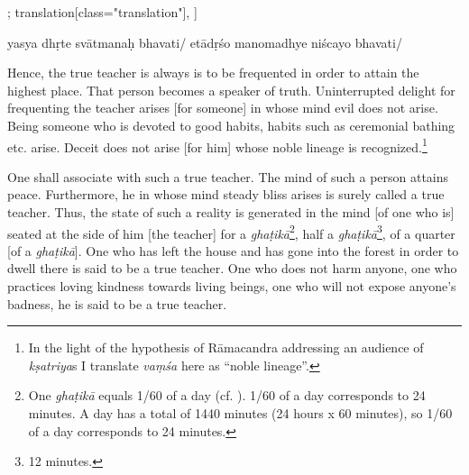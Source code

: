 \begin{alignment}[
  texts=edition[class="edition"];
  translation[class="translation"],
  ]
\begin{edition}
\begin{prose}[p57_03]
yasya
dhṛte
svātmanaḥ
bhavati/ 
etādṛśo manomadhye niścayo bhavati/
\end{prose}
  \end{edition}
  \begin{translation}
    \begin{tlate}[p57_02]
      \noindent
Hence, the true teacher is always is to be frequented in order to attain the highest place. That person becomes a speaker of truth. Uninterrupted delight for frequenting the teacher arises [for someone] in whose mind evil does not arise. Being someone who is devoted to good habits, habits such as ceremonial bathing etc. arise. Deceit does not arise [for him] whose noble lineage is recognized.\footnote{In the light of the hypothesis of Rāmacandra addressing an audience of \textit{kṣatriya}s I translate \textit{vaṃśa} here as ``noble lineage''.}

One shall associate with such a true teacher. The mind of such a person attains peace. Furthermore, he in whose mind steady bliss arises is surely called a true teacher. Thus, the state of such a reality is generated in the mind [of one who is] seated at the side of him [the teacher] for a \textit{ghaṭikā}\footnote{One \textit{ghaṭikā} equals 1/60 of a day (cf. \citeauthor[1966: 114]{sircar1966}). 1/60 of a day corresponds to 24 minutes. A day has a total of 1440 minutes (24 hours x 60 minutes), so 1/60 of a day corresponds to 24 minutes.}, half a \textit{ghaṭikā}\footnote{12 minutes.}, of a quarter [of a \textit{ghaṭikā}]. One who has left the house and has gone into the forest in order to dwell there is said to be a true teacher. One who does not harm anyone, one who practices loving kindness towards living beings, one who will not expose anyone's badness, he is said to be a true teacher.
\end{tlate}
\begin{tlate}[57_6]

\end{tlate}
\end{translation}
\end{alignment}
